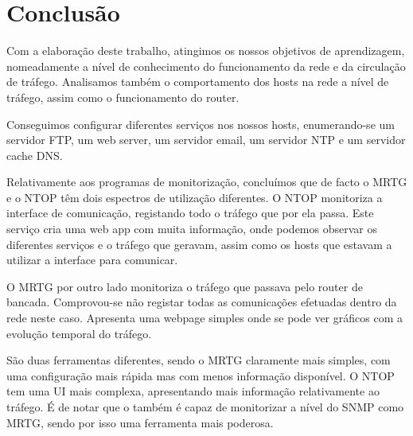 \chapter{Conclusão}

Com a elaboração deste trabalho, atingimos os nossos objetivos de aprendizagem, nomeadamente a nível de conhecimento do funcionamento da rede e da circulação de tráfego.
Analisamos também o comportamento dos hosts na rede a nível de tráfego, assim como o funcionamento do router.

Conseguimos configurar diferentes serviços nos nossos hosts, enumerando-se um servidor FTP, um web server, um servidor email, um servidor NTP e um servidor cache DNS.

Relativamente aos programas de monitorização, concluímos que de facto o MRTG e o NTOP têm dois espectros de utilização diferentes.
O NTOP monitoriza a interface de comunicação, registando todo o tráfego que por ela passa.
Este serviço cria uma web app com muita informação, onde podemos observar os diferentes serviços e o tráfego que geravam, assim como os hosts que estavam a utilizar a interface para comunicar.

O MRTG por outro lado monitoriza o tráfego que passava pelo router de bancada. Comprovou-se não registar todas as comunicações efetuadas dentro da rede neste caso.
Apresenta uma webpage simples onde se pode ver gráficos com a evolução temporal do tráfego.

São duas ferramentas diferentes, sendo o MRTG claramente mais simples, com uma configuração mais rápida mas com menos informação disponível.
O NTOP tem uma UI mais complexa, apresentando mais informação relativamente ao tráfego.
É de notar que o também é capaz de monitorizar a nível do SNMP como MRTG, sendo por isso uma ferramenta mais poderosa.



